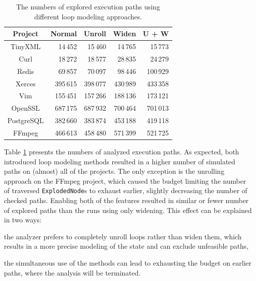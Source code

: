 \documentclass[oneside, a4paper, 12pt]{article}
\theoremstyle{definition}
\begin{document}
\begin{table}[!htb]
	\centering
\begin{tabular}{ |c||r|r|r|r| } 
	\hline
	Project & Normal & Unroll & Widen & U + W \\
	\hline \hline
	TinyXML & 14\,452 & 15\,460 & 14\,765 & 15\,773 \\ 
	\hline
	Curl & 18\,272 & 18\,577 & 28\,835 & 24\,279 \\
	\hline
	Redis & 69\,857 & 70\,097 & 98\,446 & 100\,929 \\ 
	\hline
	Xerces & 395\,615 & 398\,077 & 430\,989 & 433\,358 \\ 
	\hline
	Vim & 155\,451 & 157\,266 & 188\,136 & 173\,121 \\ 
	\hline
	OpenSSL & 687\,175 & 687\,932 & 700\,464 & 701\,013 \\ 
	\hline
	PostgreSQL & 382\,660 & 383\,874 & 453\,188 & 419\,118  \\ 
	\hline
	FFmpeg & 466\,613 & 458\,480 & 571\,399 & 521\,725  \\ 		
	\hline
\end{tabular}
\caption{The numbers of explored execution paths using different loop modeling
approaches.}\label{tab:pathnum}
\end{table}
Table \ref{tab:pathnum} presents the numbers of analyzed execution paths.
As expected, both introduced loop modeling methods resulted in a higher number of
simulated paths on (almost) all of the projects. The only exception is the unrolling 
approach on the FFmpeg project, which caused the budget limiting the number of 
traversed \texttt{ExplodedNode}s to exhaust earlier, slightly decreasing 
the number of checked paths. Enabling both of the features resulted in similar or 
fewer number of explored paths than the runs using only widening. 
This effect can be explained in two ways:   
\begin{enumerate*} [label={(\arabic*)}, noitemsep]
	\item the analyzer prefers to completely unroll loops rather than widen them, 
    which results in a more precise modeling of the state and can exclude unfeasible 
    paths,
	\item the simultaneous use of the methods can lead to exhausting the budget on earlier paths, where the analysis will be terminated.
\end{enumerate*}
\end{document}
